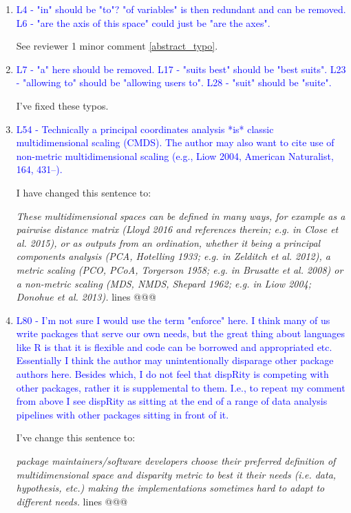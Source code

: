 \documentclass[12pt,letterpaper]{article}
\begin{document}
\begin{enumerate}

\item{\textcolor{blue}{L4 - "in" should be "to"? "of variables" is then redundant and can be removed. L6 - "are the axis of this space" could just be "are the axes".}}

See reviewer 1 minor comment \ref{abstract_typo}.

\item{\textcolor{blue}{L7 - "a" here should be removed. L17 - "suits best" should be "best suits". L23 - "allowing to" should be "allowing users to". L28 - "suit" should be "suite".}}

I've fixed these typos.

\item{\textcolor{blue}{L54 - Technically a principal coordinates analysis *is* classic multidimensional scaling (CMDS). The author may also want to cite use of non-metric multidimensional scaling (e.g., Liow 2004, American Naturalist, 164, 431–).}}
\label{PCO_cites}

I have changed this sentence to:

\textit{These multidimensional spaces can be defined in many ways, for example as a pairwise distance matrix (Lloyd 2016 and references therein; e.g. in Close et al. 2015), or as outputs from an ordination, whether it being a principal components analysis (PCA, Hotelling 1933; e.g. in Zelditch et al. 2012), a metric scaling (PCO, PCoA, Torgerson 1958; e.g. in Brusatte et al. 2008) or a non-metric scaling (MDS, NMDS, Shepard 1962; e.g. in Liow 2004; Donohue et al. 2013).} lines @@@

\item{\textcolor{blue}{L80 - I'm not sure I would use the term "enforce" here. I think many of us write packages that serve our own needs, but the great thing about languages like R is that it is flexible and code can be borrowed and appropriated etc. Essentially I think the author may unintentionally disparage other package authors here. Besides which, I do not feel that dispRity is competing with other packages, rather it is supplemental to them. I.e., to repeat my comment from above I see dispRity as sitting at the end of a range of data analysis pipelines with other packages sitting in front of it.}}

I've change this sentence to:

\textit{package maintainers/software developers choose their preferred definition of multidimensional space and disparity metric to best it their needs (i.e. data, hypothesis, etc.) making the implementations sometimes hard to adapt to different needs.}  lines @@@


\end{enumerate}
\end{document}
